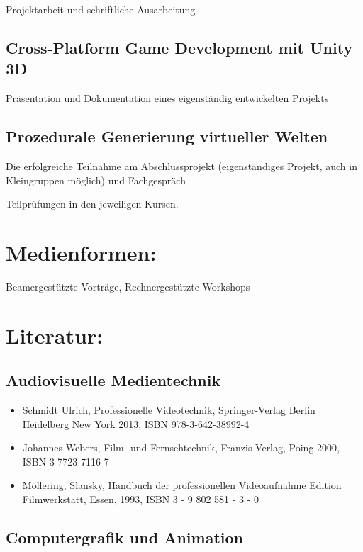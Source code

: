 Projektarbeit und schriftliche Ausarbeitung

\subsection*{Cross-Platform Game Development mit Unity
3D}\label{cross-platform-game-development-mit-unity-3d-2}

Präsentation und Dokumentation eines eigenständig entwickelten Projekts

\subsection*{Prozedurale Generierung virtueller
Welten}\label{prozedurale-generierung-virtueller-welten-2}

Die erfolgreiche Teilnahme am Abschlussprojekt (eigenständiges Projekt,
auch in Kleingruppen möglich) und Fachgespräch

Teilprüfungen in den jeweiligen Kursen.

\section*{Medienformen:}\label{medienformen-16}

Beamergestützte Vorträge, Rechnergestützte Workshops

\section*{Literatur:}\label{literatur-21}

\subsection*{Audiovisuelle
Medientechnik}\label{audiovisuelle-medientechnik-3}

\begin{itemize}
\item
  Schmidt Ulrich, Professionelle Videotechnik, Springer-Verlag Berlin
  Heidelberg New York 2013, ISBN 978-3-642-38992-4
\item
  Johannes Webers, Film- und Fernsehtechnik, Franzis Verlag, Poing 2000,
  ISBN 3-7723-7116-7
\item
  Möllering, Slansky, Handbuch der professionellen Videoaufnahme Edition
  Filmwerkstatt, Essen, 1993, ISBN 3 - 9 802 581 - 3 - 0
\end{itemize}

\subsection*{Computergrafik und
Animation}\label{computergrafik-und-animation-3}

